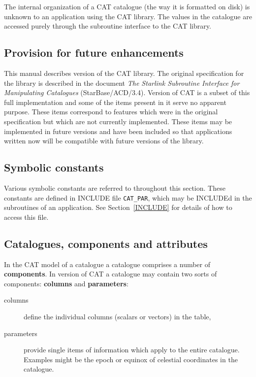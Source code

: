 The internal organization of a CAT catalogue (the way it is formatted 
on disk) is unknown to an application using the CAT library. The values 
in the catalogue are accessed purely through the subroutine interface to
the CAT library.


\subsection{Provision for future enhancements}

This manual describes version \CATversion of the CAT library.  The
original specification for the library is described in the document {\it
The Starlink Subroutine Interface for Manipulating Catalogues} 
(StarBase/ACD/3.4)\cite{STARBASE34}.  Version \CATversion of CAT is a
subset of this full implementation and some of the items present in it
serve no apparent purpose.  These items correspond to features which were
in the original specification but which are not currently implemented.
These items may be implemented in future versions and have been included
so that applications written now will be compatible with future versions
of the library.

\subsection{Symbolic constants}

Various symbolic constants are referred to throughout this section.
These constants are defined in INCLUDE file {\tt CAT\_PAR}, which may
be INCLUDEd in the subroutines of an application. See 
Section~\ref{INCLUDE} for details of how to access this file.


\subsection{\label{CCA}Catalogues, components and attributes}

In the CAT model of a catalogue a catalogue comprises a number of {\bf
components}. In version \CATversion of CAT a catalogue may contain
two sorts of components: {\bf columns} and {\bf parameters}:

\begin{description}

  \item[columns] define the individual columns (scalars or vectors) in 
   the table,

  \item[parameters] provide single items of information which apply to
   the entire catalogue. Examples might be the epoch or equinox of
   celestial coordinates in the catalogue.


\end{description}

